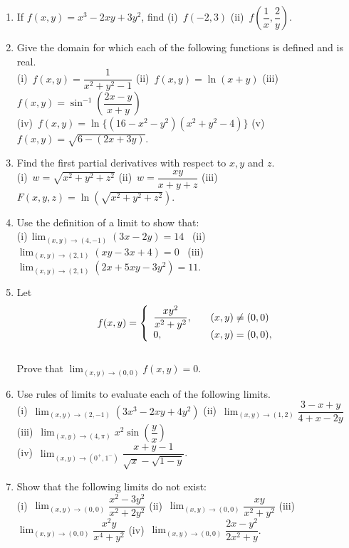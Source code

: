 \documentclass[titlepage,a4paper,12pt]{report}
\begin{document}
\begin{enumerate}
\item If $f(x,y)=x^3-2xy+3y^2$, find (i)\, $f(-2,3)$ \quad (ii)\, $f\left(\dfrac{1}{x}, \dfrac{2}{y}\right)$.
\item Give the domain for which each of the following functions is defined and is real.\\
(i)\, $f(x,y)=\dfrac{1}{x^2+y^2-1}$ \quad (ii)\, $f(x,y)=\ln (x+y)$ \quad (iii)\, $f(x,y)=\sin ^{-1}\left(\dfrac{2x-y}{x+y}\right)$ \\ (iv)\, $f(x,y)=\ln \{(16-x^2-y^2)(x^2+y^2-4)\}$ \quad (v)\, $f(x,y)=\sqrt{6-(2x+3y)}$.
\item Find the first partial derivatives with respect to $x,y$ and $z$.\\
(i)\, $w=\sqrt{x^2+y^2+z^2}$ \quad (ii)\, $w=\dfrac{xy}{x+y+z}$ \quad (iii)\, $F(x,y,z)=\ln (\sqrt{x^2+y^2+z^2})$.
\item Use the definition of a limit to show that:\\ (i)\,$\displaystyle \lim _{(x,y)\rightarrow (4,-1)}(3x-2y)=14$ \, (ii) $\displaystyle \lim _{(x,y)\rightarrow (2,1)}(xy-3x+4)=0$ \, (iii) $\displaystyle \lim _{(x,y)\rightarrow (2,1)}(2x+5xy-3y^2)=11$.
\item Let \[f(x,y) = \left\{ 
\begin{array}{l l}
 \dfrac{xy^2}{x^2+y^2}, & \quad (x,y)\neq (0,0)\\
  0, & \quad (x,y)=(0,0),\\ \end{array} \right. \]\\
Prove that $\displaystyle \lim _{(x,y)\rightarrow (0,0)}f(x,y)=0$.
\item Use rules of limits to evaluate each of the following limits.\\
(i)\, $\displaystyle \lim _{(x,y)\rightarrow (2,-1)}(3x^3-2xy+4y^2)$ \quad (ii)\, $\displaystyle \lim _{(x,y)\rightarrow (1,2)}\dfrac{3-x+y}{4+x-2y}$ \quad (iii)\, $\displaystyle \lim _{(x,y)\longrightarrow (4,\pi)}x^2\sin \left(\dfrac{y}{x}\right)$ \\ (iv)\, $\displaystyle \lim _{(x,y)\rightarrow (0^+, 1^-)}\dfrac{x+y-1}{\sqrt{x}-\sqrt{1-y}}$.
\item Show that the following limits do not exist:\\
(i)\, $\displaystyle \lim _{(x,y)\rightarrow (0,0)}\dfrac{x^2-3y^2}{x^2+2y^2}$ \quad (ii)\, $\displaystyle \lim _{(x,y)\rightarrow (0,0)}\dfrac{xy}{x^2+y^2}$ \quad (iii)\, $\displaystyle \lim _{(x,y)\rightarrow (0,0)}\dfrac{x^{2}y}{x^4+y^2}$ \quad (iv)\, $\displaystyle \lim _{(x,y)\rightarrow (0,0)}\dfrac{2x-y^2}{2x^2+y}$.

\end{enumerate}
\end{document}
